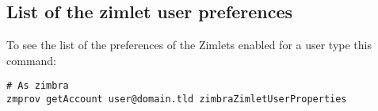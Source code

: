    \subsection{List of the zimlet user preferences}
    \label{==sect:gatheringinfo-userzimlets-pref==}
        To see the list of the preferences of the Zimlets enabled for a user type this command:
        \begin{verbatim}
# As zimbra
zmprov getAccount user@domain.tld zimbraZimletUserProperties
        \end{verbatim}

